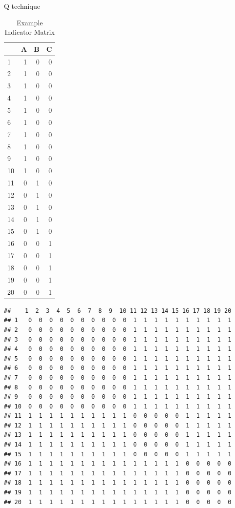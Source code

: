 \documentclass[
  12pt,
]{book}
\theoremstyle{definition}
\theoremstyle{definition}
\theoremstyle{definition}
\theoremstyle{definition}
\theoremstyle{remark}
\begin{document}
Q technique

\begin{table}

\caption{\label{tab:catexampleindicator}Example Indicator Matrix}
\centering
\begin{tabular}[t]{l|r|r|r}
\hline
  & A & B & C\\
\hline
1 & 1 & 0 & 0\\
\hline
2 & 1 & 0 & 0\\
\hline
3 & 1 & 0 & 0\\
\hline
4 & 1 & 0 & 0\\
\hline
5 & 1 & 0 & 0\\
\hline
6 & 1 & 0 & 0\\
\hline
7 & 1 & 0 & 0\\
\hline
8 & 1 & 0 & 0\\
\hline
9 & 1 & 0 & 0\\
\hline
10 & 1 & 0 & 0\\
\hline
11 & 0 & 1 & 0\\
\hline
12 & 0 & 1 & 0\\
\hline
13 & 0 & 1 & 0\\
\hline
14 & 0 & 1 & 0\\
\hline
15 & 0 & 1 & 0\\
\hline
16 & 0 & 0 & 1\\
\hline
17 & 0 & 0 & 1\\
\hline
18 & 0 & 0 & 1\\
\hline
19 & 0 & 0 & 1\\
\hline
20 & 0 & 0 & 1\\
\hline
\end{tabular}
\end{table}

\begin{verbatim}
##    1  2  3  4  5  6  7  8  9  10 11 12 13 14 15 16 17 18 19 20
## 1   0  0  0  0  0  0  0  0  0  0  1  1  1  1  1  1  1  1  1  1
## 2   0  0  0  0  0  0  0  0  0  0  1  1  1  1  1  1  1  1  1  1
## 3   0  0  0  0  0  0  0  0  0  0  1  1  1  1  1  1  1  1  1  1
## 4   0  0  0  0  0  0  0  0  0  0  1  1  1  1  1  1  1  1  1  1
## 5   0  0  0  0  0  0  0  0  0  0  1  1  1  1  1  1  1  1  1  1
## 6   0  0  0  0  0  0  0  0  0  0  1  1  1  1  1  1  1  1  1  1
## 7   0  0  0  0  0  0  0  0  0  0  1  1  1  1  1  1  1  1  1  1
## 8   0  0  0  0  0  0  0  0  0  0  1  1  1  1  1  1  1  1  1  1
## 9   0  0  0  0  0  0  0  0  0  0  1  1  1  1  1  1  1  1  1  1
## 10  0  0  0  0  0  0  0  0  0  0  1  1  1  1  1  1  1  1  1  1
## 11  1  1  1  1  1  1  1  1  1  1  0  0  0  0  0  1  1  1  1  1
## 12  1  1  1  1  1  1  1  1  1  1  0  0  0  0  0  1  1  1  1  1
## 13  1  1  1  1  1  1  1  1  1  1  0  0  0  0  0  1  1  1  1  1
## 14  1  1  1  1  1  1  1  1  1  1  0  0  0  0  0  1  1  1  1  1
## 15  1  1  1  1  1  1  1  1  1  1  0  0  0  0  0  1  1  1  1  1
## 16  1  1  1  1  1  1  1  1  1  1  1  1  1  1  1  0  0  0  0  0
## 17  1  1  1  1  1  1  1  1  1  1  1  1  1  1  1  0  0  0  0  0
## 18  1  1  1  1  1  1  1  1  1  1  1  1  1  1  1  0  0  0  0  0
## 19  1  1  1  1  1  1  1  1  1  1  1  1  1  1  1  0  0  0  0  0
## 20  1  1  1  1  1  1  1  1  1  1  1  1  1  1  1  0  0  0  0  0
\end{verbatim}
\end{document}
